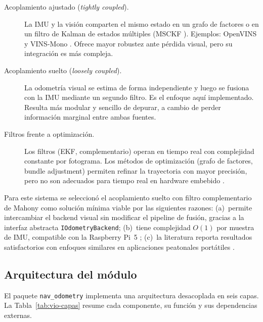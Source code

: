 \begin{description}
  \item[Acoplamiento ajustado (\emph{tightly coupled}).] La IMU y la visión
    comparten el mismo estado en un grafo de factores o en un filtro de Kalman
    de estados múltiples (MSCKF \cite{Mourikis2007}). Ejemplos: OpenVINS y
    VINS-Mono \cite{Qin2018}. Ofrece mayor robustez ante pérdida visual, pero
    su integración es más compleja.

  \item[Acoplamiento suelto (\emph{loosely coupled}).] La odometría visual se
    estima de forma independiente y luego se fusiona con la IMU mediante un
    segundo filtro. Es el enfoque aquí implementado. Resulta más modular y
    sencillo de depurar, a cambio de perder información marginal entre ambas
    fuentes.

  \item[Filtros frente a optimización.] Los filtros (EKF, complementario)
    operan en tiempo real con complejidad constante por fotograma. Los métodos
    de optimización (grafo de factores, bundle adjustment) permiten refinar la
    trayectoria con mayor precisión, pero no son adecuados para tiempo real en
    hardware embebido \cite{Engel2018}.
\end{description}

Para este sistema se seleccionó el acoplamiento suelto con filtro
complementario de Mahony como solución mínima viable por las siguientes
razones: (a)~permite intercambiar el backend visual sin modificar el pipeline
de fusión, gracias a la interfaz abstracta \texttt{IOdometryBackend};
(b)~tiene complejidad $O(1)$ por muestra de IMU, compatible con la Raspberry
Pi~5 \cite{RaspberryPi}; (c)~la literatura reporta resultados satisfactorios
con enfoques similares en aplicaciones peatonales portátiles
\cite{Lee2016RGBD, Zhang2021DVIO}.

\subsection{Arquitectura del módulo}

El paquete \texttt{nav\_odometry} implementa una arquitectura desacoplada en
seis capas. La Tabla~\ref{tab:vio-capas} resume cada componente, su función
y sus dependencias externas.


